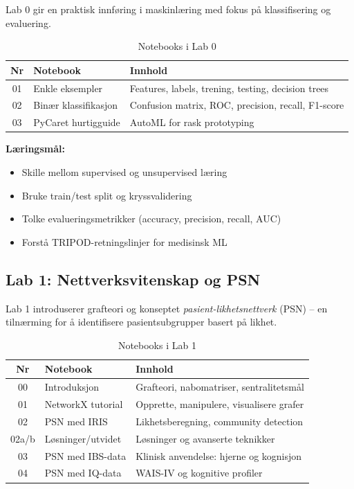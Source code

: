 \documentclass[11pt,a4paper]{article}
\begin{document}
Lab 0 gir en praktisk innføring i maskinlæring med fokus på klassifisering og evaluering.

\begin{table}[htbp]
\centering
\caption{Notebooks i Lab 0}
\label{tab:lab0}
\begin{tabular}{@{}clp{7cm}@{}}
\toprule
\textbf{Nr} & \textbf{Notebook} & \textbf{Innhold} \\
\midrule
01 & Enkle eksempler & Features, labels, trening, testing, decision trees \\
02 & Binær klassifikasjon & Confusion matrix, ROC, precision, recall, F1-score \\
03 & PyCaret hurtigguide & AutoML for rask prototyping \\
\bottomrule
\end{tabular}
\end{table}

\textbf{Læringsmål:}
\begin{itemize}[nosep]
    \item Skille mellom supervised og unsupervised læring
    \item Bruke train/test split og kryssvalidering
    \item Tolke evalueringsmetrikker (accuracy, precision, recall, AUC)
    \item Forstå TRIPOD-retningslinjer for medisinsk ML
\end{itemize}

\subsection{Lab 1: Nettverksvitenskap og PSN}

Lab 1 introduserer grafteori og konseptet \emph{pasient-likhetsnettverk} (PSN) -- en tilnærming for å identifisere pasientsubgrupper basert på likhet.

\begin{table}[htbp]
\centering
\caption{Notebooks i Lab 1}
\label{tab:lab1}
\begin{tabular}{@{}clp{6.5cm}@{}}
\toprule
\textbf{Nr} & \textbf{Notebook} & \textbf{Innhold} \\
\midrule
00 & Introduksjon & Grafteori, nabomatriser, sentralitetsmål \\
01 & NetworkX tutorial & Opprette, manipulere, visualisere grafer \\
02 & PSN med IRIS & Likhetsberegning, community detection \\
02a/b & Løsninger/utvidet & Løsninger og avanserte teknikker \\
03 & PSN med IBS-data & Klinisk anvendelse: hjerne og kognisjon \\
04 & PSN med IQ-data & WAIS-IV og kognitive profiler \\
\bottomrule
\end{tabular}
\end{table}
\end{document}
